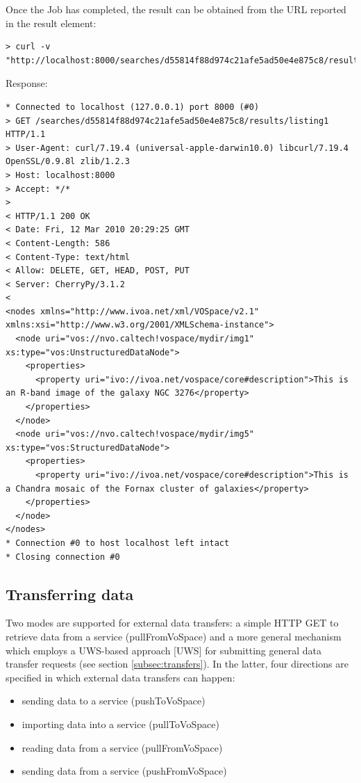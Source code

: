 \documentclass[11pt,a4paper]{ivoa}
\begin{document}
Once the Job has completed, the result can be obtained from the URL reported in the result element:
\begin{lstlisting}
> curl -v "http://localhost:8000/searches/d55814f88d974c21afe5ad50e4e875c8/results/listing1"
\end{lstlisting}
Response:
\begin{lstlisting}
* Connected to localhost (127.0.0.1) port 8000 (#0)
> GET /searches/d55814f88d974c21afe5ad50e4e875c8/results/listing1 HTTP/1.1
> User-Agent: curl/7.19.4 (universal-apple-darwin10.0) libcurl/7.19.4 OpenSSL/0.9.8l zlib/1.2.3
> Host: localhost:8000
> Accept: */*
> 
< HTTP/1.1 200 OK
< Date: Fri, 12 Mar 2010 20:29:25 GMT
< Content-Length: 586
< Content-Type: text/html
< Allow: DELETE, GET, HEAD, POST, PUT
< Server: CherryPy/3.1.2
< 
<nodes xmlns="http://www.ivoa.net/xml/VOSpace/v2.1"
xmlns:xsi="http://www.w3.org/2001/XMLSchema-instance">
  <node uri="vos://nvo.caltech!vospace/mydir/img1" xs:type="vos:UnstructuredDataNode">
    <properties>
      <property uri="ivo://ivoa.net/vospace/core#description">This is an R-band image of the galaxy NGC 3276</property>
    </properties>
  </node>
  <node uri="vos://nvo.caltech!vospace/mydir/img5" xs:type="vos:StructuredDataNode">
    <properties>
      <property uri="ivo://ivoa.net/vospace/core#description">This is a Chandra mosaic of the Fornax cluster of galaxies</property>
    </properties>
  </node>
</nodes>
* Connection #0 to host localhost left intact
* Closing connection #0
\end{lstlisting}

\subsection{Transferring data}
\label{subsec:transferringdata}
Two modes are supported for external data transfers: a simple HTTP GET to retrieve data from a service (pullFromVoSpace) and a more general mechanism which employs a UWS-based approach [UWS] for submitting general data transfer requests (see section \ref{subsec:transfers}). In the latter, four directions are specified in which external data transfers can happen:
\begin{itemize}
    \item sending data to a service (pushToVoSpace)
    \item importing data into a service (pullToVoSpace)
    \item reading data from a service (pullFromVoSpace)
    \item sending data from a service (pushFromVoSpace)
\end{itemize}
\end{document}
